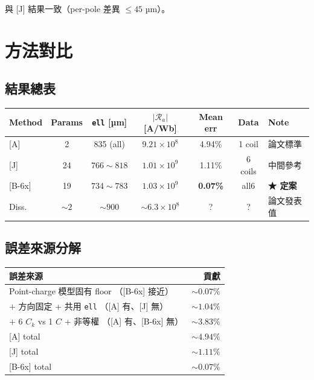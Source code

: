 \documentclass[11pt,a4paper]{article}
\newcommand{\Ra}{\mathcal{R}_a}
\begin{document}
與 [J] 結果一致（per-pole 差異 \(\le 45\) µm）。

\section{方法對比}

\subsection{結果總表}

\begin{center}
\begin{tabular}{lcccccl}
\toprule
Method   & Params & \texttt{ell} [µm]   & \(|\Ra|\) [A/Wb]  & Mean err & Data         & Note \\
\midrule
{[A]}    & 2      & 835 (all)           & \(9.21 \times 10^8\) & 4.94\%   & 1 coil       & 論文標準 \\
{[J]}    & 24     & \(766 \sim 818\)     & \(1.01 \times 10^9\) & 1.11\%   & 6 coils      & 中間參考 \\
{[B-6x]} & 19     & \(734 \sim 783\)     & \(1.03 \times 10^9\) & \textbf{0.07\%} & all6 & \textbf{★ 定案} \\
\midrule
Diss.    & \(\sim 2\) & \(\sim 900\)     & \(\sim 6.3 \times 10^8\) & ?    & ?            & 論文發表值 \\
\bottomrule
\end{tabular}
\end{center}

\subsection{誤差來源分解}

\begin{center}
\begin{tabular}{lr}
\toprule
誤差來源                                            & 貢獻 \\
\midrule
Point-charge 模型固有 floor （[B-6x] 接近）          & \(\sim 0.07\%\) \\
\(+\) 方向固定 + 共用 \texttt{ell}                  （[A] 有、[J] 無） & \(\sim 1.04\%\) \\
\(+\) 6 \(C_k\) vs 1 \(C\) + 非等權              （[A] 有、[B-6x] 無）  & \(\sim 3.83\%\) \\
\midrule
{[A]} total                                         & \(\sim 4.94\%\) \\
{[J]} total                                         & \(\sim 1.11\%\) \\
{[B-6x]} total                                      & \(\sim 0.07\%\) \\
\bottomrule
\end{tabular}
\end{center}
\end{document}
